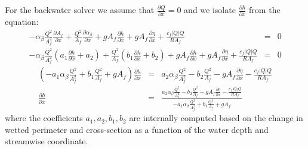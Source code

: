 \documentclass[a4paper, 11pt]{article}
\newcommand{\pathfile}[1]{$<$#1$>$}
\newcommand{\pa}[2]{\ensuremath{\frac{\partial #1}{\partial #2}}}
\begin{document}
For the backwater solver we assume that $\pa{Q}{x}=0$ and we isolate $\pa{h}{x}$ from the equation:
\begin{eqnarray}
\nonumber
-\alpha_{\beta}\frac{Q^2}{A_f^2} \pa{A_f}{x} +\frac{Q^2}{A_f}\pa{\alpha_{\beta}}{x} + gA_f \pa{h}{x} + gA_f \pa{\eta}{x} + \frac{c_f|Q|Q}{RA_f} &=& 0\\
\nonumber
-\alpha_{\beta}\frac{Q^2}{A_f^2} \left(a_1\pa{h}{x} +a_2 \right) +\frac{Q^2}{A_f}\left(b_1\pa{h}{x}+b_2\right) + gA_f \pa{h}{x} + gA_f \pa{\eta}{x} + \frac{c_f|Q|Q}{RA_f} &=& 0
\end{eqnarray}
\begin{eqnarray}
\nonumber
\left(-a_1 \alpha_{\beta} \frac{Q^2}{A_f^2} + b_1 \frac{Q^2}{A_f} + gA_f \right)\pa{h}{x} &=& a_2 \alpha_{\beta} \frac{Q^2}{A_f^2} - b_2 \frac{Q^2}{A_f} -gA_f\pa{\eta}{x} - \frac{c_f|Q|Q}{RA_f}\\
\pa{h}{x} &=& \frac{a_2 \alpha_{\beta} \frac{Q^2}{A_f^2} - b_2 \frac{Q^2}{A_f} -gA_f\pa{\eta}{x} - \frac{c_f|Q|Q}{RA_f}}{-a_1 \alpha_{\beta} \frac{Q^2}{A_f^2} + b_1 \frac{Q^2}{A_f} + gA_f }
\end{eqnarray} 
where the coefficients $a_1,a_2,b_1,b_2$ are internally computed based on the change in wetted perimeter and cross-section as a function of the water depth and streamwise coordinate.



%
%
%
%
%


\end{document}
